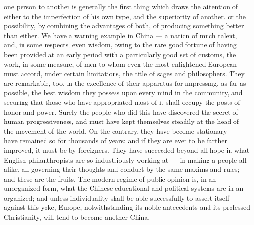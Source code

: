 \documentclass[12pt]{report}
\begin{document}
one person to another is generally the first thing which draws the attention of either to the imperfection of his own type, and the superiority of another, or the possibility, by combining the advantages of both, of producing something better than either. We have a warning example in China — a nation of much talent, and, in some respects, even wisdom, owing to the rare good fortune of having been provided at an early period with a particularly good set of customs, the work, in some measure, of men to whom even the most enlightened European must accord, under certain limitations, the title of sages and philosophers. They are remarkable, too, in the excellence of their apparatus for impressing, as far as possible, the best wisdom they possess upon every mind in the community, and securing that those who have appropriated most of it shall occupy the posts of honor and power. Surely the people who did this have discovered the secret of human progressiveness, and must have kept themselves steadily at the head of the movement of the world. On the contrary, they have become stationary — have remained so for thousands of years; and if they are ever to be farther improved, it must be by foreigners. They have succeeded beyond all hope in what English philanthropists are so industriously working at — in making a people all alike, all governing their thoughts and conduct by the same maxims and rules; and these are the fruits. The modern regime of public opinion is, in an unorganized form, what the Chinese educational and political systems are in an organized; and unless individuality shall be able successfully to assert itself against this yoke, Europe, notwithstanding its noble antecedents and its professed Christianity, will tend to become another China.
\end{document}
